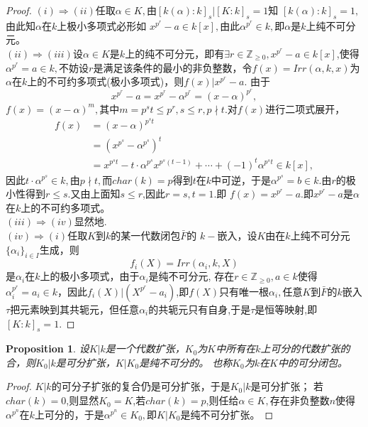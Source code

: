 \documentclass[UTF8]{article}
\newtheorem{prop}{Proposition}[section]
\begin{document}
\begin{proof}
	$(i)\Rightarrow (ii)$任取$\alpha\in K,$由$[k(\alpha):k]_{s}|[K:k]_{s}=1$知
	$[k(\alpha):k]_{s}=1,$由此知$\alpha$在$k$上极小多项式必形如
	$x^{p^{r}}-a\in k[x],$由此$\alpha^{p^{r}}\in k,$即$\alpha$是$k$上纯不可分元。\\
	$(ii)\Rightarrow (iii)$设$\alpha\in K$是$k$上的纯不可分元，即有$\exists r\in \mathbb{Z}_{\geq 0},x^{p^{r}}-a\in k[x]$,使得$\alpha^{p^{r}}=a\in k,$不妨设$r$是满足该条件的最小的非负整数，令$f(x)=Irr(\alpha,k,x)$为$\alpha$在$k$上的不可约多项式(极小多项式)，则$f(x)|x^{p^{r}}-a.$
	由于
	$$x^{p^{r}}-a=x^{p^{r}}-\alpha^{p^{r}}=(x-\alpha)^{p^{r}},$$
	$f(x)=(x-\alpha)^{m},$其中$m=p^{s}t\leq p^{r},s\leq r,p\nmid t.$对$f(x)$进行二项式展开，
	\[
	\begin{split}
	f(x)&=(x-\alpha)^{p^{s}t}\\
	&=(x^{p^{s}}-\alpha^{p^{s}})^{t}\\
	&=x^{p^{s}t}-t\cdot \alpha^{p^{s}}x^{p^{s}(t-1)}+\cdots+(-1)^{t}\alpha^{p^{s}t}\in k[x],
	\end{split}		
	\]
	因此$t\cdot \alpha^{p^{s}}\in k,$由$p\nmid t,$而$char(k)=p$得到$t$在$k$中可逆，于是$\alpha^{p^{s}}=b\in k$.由$r$的极小性得到$r\leq s.$又由上面知$s\leq r$,因此$r=s,t=1.$即
	$f(x)=x^{p^{r}}-a$.即$x^{p^{r}}-a$是$\alpha$在$k$上的不可约多项式。\\
	$(iii)\Rightarrow(iv)$显然地.\\
	$(iv)\Rightarrow (i)$任取$K$到$k$的某一代数闭包$\bar{F}$的
	$k-$嵌入，设$K$由在$k$上纯不可分元$\{\alpha_{i}\}_{i\in I}$生成，则
	$$
	f_{i}(X)=Irr(\alpha_{i},k,X)
	$$
	是$\alpha_{i}$在$k$上的极小多项式，由于$\alpha_{i}$是纯不可分元,
	存在$r\in \mathbb{Z}_{\geq 0},a\in k$使得$\alpha_{i}^{p^{r}}= a_{i}\in k$，因此$f_{i}(X)|(X^{p^{r}}-a_{i})$,即$f(X)$只有唯一根$\alpha_{i},$任意$K$到$\bar{F}$的$k$嵌入$\tau$把元素映到其共轭元，但任意$\alpha_{i}$的共轭元只有自身,于是$\tau$是恒等映射,即$[K:k]_{s}=1.$
\end{proof}

\begin{prop}
设$K|k$是一个代数扩张，$K_{0}$为$K$中所有在$k$上可分的代数扩张的合，则$K_{0}|k$是可分扩张，$K|K_{0}$是纯不可分的。
也称$K_{0}$为$k$在$K$中的可分闭包。
\end{prop}
\begin{proof}
	
	$K|k$的可分子扩张的复合仍是可分扩张，于是$K_{0}|k$是可分扩张；
	若$char(k)=0$,则显然$K_{0}=K$,若$char(k)=p$,则任给$\alpha\in K,$存在非负整数$n$使得$\alpha^{p^{n}}$在$k$上可分的，于是$\alpha^{p^{n}}\in K_{0},$即$K|K_{0}$是纯不可分扩张。
\end{proof}
\end{document}
